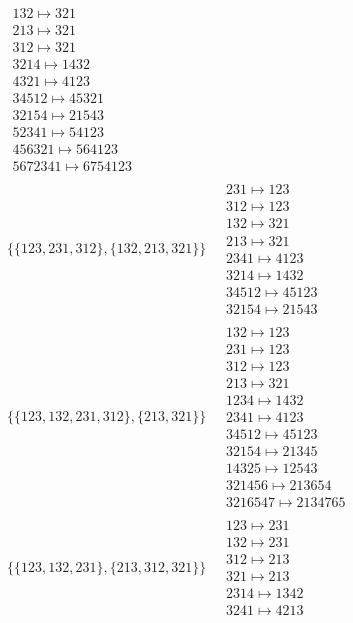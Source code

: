 \begin{scriptsize}
\begin{align}
\begin{matrix}
\\
132 \mapsto 321
\\
213 \mapsto 321
\\
312 \mapsto 321
\\
3214 \mapsto 1432
\\
4321 \mapsto 4123
\\
34512 \mapsto 45321
\\
32154 \mapsto 21543
\\
52341 \mapsto 54123
\\
456321 \mapsto 564123
\\
5672341 \mapsto 6754123
\end{matrix}
\\
\{\{123, 231, 312\}, \{132, 213, 321\}\}
\ 
&
\begin{matrix}
231 \mapsto 123
\\
312 \mapsto 123
\\
132 \mapsto 321
\\
213 \mapsto 321
\\
2341 \mapsto 4123
\\
3214 \mapsto 1432
\\
34512 \mapsto 45123
\\
32154 \mapsto 21543
\end{matrix}
\\
\{\{123, 132, 231, 312\}, \{213, 321\}\}
\ 
&
\begin{matrix}
132 \mapsto 123
\\
231 \mapsto 123
\\
312 \mapsto 123
\\
213 \mapsto 321
\\
1234 \mapsto 1432
\\
2341 \mapsto 4123
\\
34512 \mapsto 45123
\\
32154 \mapsto 21345
\\
14325 \mapsto 12543
\\
321456 \mapsto 213654
\\
3216547 \mapsto 2134765
\end{matrix}
\\
\{\{123, 132, 231\}, \{213, 312, 321\}\}
\ 
&
\begin{matrix}
123 \mapsto 231
\\
132 \mapsto 231
\\
312 \mapsto 213
\\
321 \mapsto 213
\\
2314 \mapsto 1342
\\
3241 \mapsto 4213

\end{matrix}
\end{align}
\end{scriptsize}

